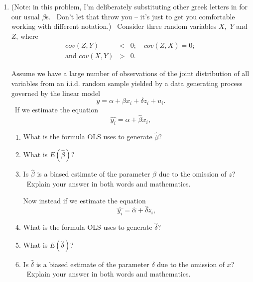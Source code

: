 \documentclass[11pt]{article}
\begin{document}
\begin{enumerate}
\item (Note: in this problem, I'm deliberately substituting other greek
letters in for our usual $\beta $s. \ Don't let that throw you -- it's just
to get you comfortable working with different notation.) \ Consider three
random variables $X,$ $Y$ and $Z$, where%
\begin{eqnarray*}
cov(Z,Y) &<&0;\quad cov(Z,X)=0\text{; } \\
\text{and }cov(X,Y) &>&0\text{.}
\end{eqnarray*}%
\smallskip 

Assume we have a large number of observations of the joint distribution of
all variables from an i.i.d. random sample yielded by a data generating
process governed by the linear model%
\begin{equation*}
y=\alpha +\beta x_{i}+\delta z_{i}+u_{i}.
\end{equation*}%
\smallskip \qquad\ If we estimate the equation 
\begin{equation*}
\widehat{y_{i}}=\widehat{\alpha }+\widehat{\beta }x_{i},
\end{equation*}

\begin{enumerate}
\item What is the formula OLS uses to generate $\widehat{\beta }$? $\ $

\item What is $E\left( \widehat{\beta }\right) $? 

\item Is $\widehat{\beta }$ is a biased estimate of the parameter $\beta $
due to the omission of $z$? \ Explain your answer in both words and
mathematics.\bigskip \bigskip 

Now instead if we estimate the equation 
\begin{equation*}
\widehat{y_{i}}=\widehat{\alpha }+\widehat{\delta }z_{i},
\end{equation*}

\item What is the formula OLS uses to generate $\widehat{\delta }$? $\ $

\item What is $E\left( \widehat{\delta }\right) $? 

\item Is $\widehat{\delta }$ is a biased estimate of the parameter $\delta $
due to the omission of $x$? \ Explain your answer in both words and
mathematics.\newpage 


\end{enumerate}
\end{enumerate}
\end{document}
